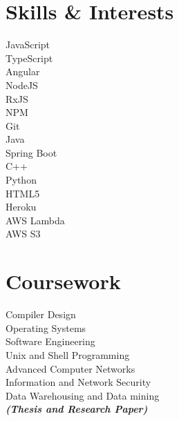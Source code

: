 \documentclass[]{deedy-resume-openfont}
\begin{document}
\begin{minipage}[t]{0.33\textwidth}

\section{Skills \& Interests}
\sectionsep
{}
\textbullet{} JavaScript \\
\textbullet{}   TypeScript \\
\textbullet{} Angular \\
\textbullet{} NodeJS \\
\textbullet{} RxJS \\ 
\textbullet{} NPM \\
\textbullet{} Git \\
\textbullet{} Java \\
\textbullet{} Spring Boot \\
\sectionsep
{}
\textbullet{} C++ \\
\textbullet{} Python \\
\textbullet{} HTML5 \\
\textbullet{} Heroku \\
\textbullet{} AWS Lambda \\
\textbullet{} AWS S3 \\
\sectionsep


\section{Coursework}
Compiler Design \\
Operating Systems \\
Software Engineering \\
Unix and Shell Programming \\
Advanced Computer Networks \\
Information and Network Security \\
Data Warehousing and Data mining  \\
{\footnotesize \textit{\textbf{(Thesis and Research Paper) }}} \\


%
%

\end{minipage} 
\hfill
\end{document}
